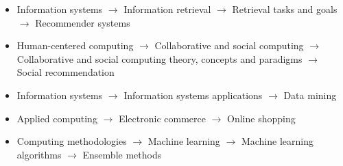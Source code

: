 \begin{itemize}[leftmargin=*]

\item Information systems $\rightarrow$ Information retrieval $\rightarrow$ Retrieval tasks and goals $\rightarrow$ Recommender systems
\item Human-centered computing $\rightarrow$ Collaborative and social computing $\rightarrow$ Collaborative and social computing theory, concepts and paradigms $\rightarrow$ Social recommendation
\item Information systems $\rightarrow$ Information systems applications $\rightarrow$ Data mining
\item Applied computing $\rightarrow$ Electronic commerce $\rightarrow$ Online shopping
\item Computing methodologies $\rightarrow$ Machine learning $\rightarrow$ Machine learning algorithms $\rightarrow$ Ensemble methods

\end{itemize}



